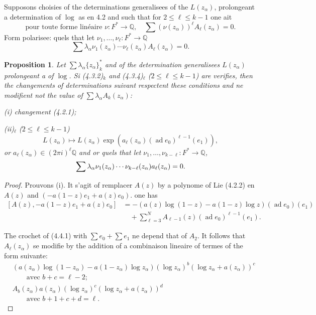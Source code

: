 \documentclass[12pt,a4paper]{article}
\theoremstyle{plain}
\newtheorem{proposition}{Proposition}[section]
\theoremstyle{definition}
\theoremstyle{remark}
\DeclareMathOperator{\ad}{ad}
\newcommand{\Q}{\mathbb{Q}}
\begin{document}
{{Supposons choisies of the determinations generalisees of the $L(z_\alpha)$, prolongeant a determination of $\log$ as en 4.2 and such that for $2\leq\ell\leq k-1$ one ait
\begin{equation}\label{eq:4.3.4}
\text{pour toute forme lin\'eaire }\nu:F^*\to\Q,\quad\sum(\nu(z_\alpha))^\ell A_\ell(z_\alpha)=0.\tag{4.3.4}
\end{equation}
Form polarisee: quels that let $\nu_1,\ldots,\nu_\ell:F^*\to\Q$
\begin{equation}\label{eq:4.3.5}
\sum\lambda_\alpha\nu_1(z_\alpha)\cdots\nu_\ell(z_\alpha)A_\ell(z_\alpha)=0.\tag{4.3.5}
\end{equation}

\begin{proposition}
Let $\sum\lambda_\alpha\{z_\alpha\}_k^*$ and of the determination generalisees $L(z_\alpha)$ prolongeant a of $\log$. Si (4.3.2)$_k$ and (4.3.4)$_\ell$ ($2\leq\ell\leq k-1$) are verifies, then the changements of determinations suivant respectent these conditions and ne modifient not the value of $\sum\lambda_\alpha A_k(z_\alpha)$:

\textup{(i)} changement (4.2.1);

\textup{(ii)}$_\ell$ ($2\leq\ell\leq k-1$)
\begin{equation*}
L(z_\alpha) \longmapsto L(z_\alpha)\exp(a_\ell(z_\alpha)(\ad e_0)^{\ell-1}(e_1)),
\end{equation*}
or $a_\ell(z_\alpha)\in(2\pi i)^\ell\Q$ and or quels that let $\nu_1,\ldots,\nu_{k-\ell}:F^*\to\Q$,
\begin{equation*}
\sum\lambda_\alpha\nu_1(z_\alpha)\cdots\nu_{k-\ell}(z_\alpha)a_\ell(z_\alpha)=0.\qedhere
\end{equation*}
\end{proposition}

\begin{proof}
Prouvons (i). It s'agit of remplacer $A(z)$ by a polynome of Lie (4.2.2) en $A(z)$ and $(-a(1-z)e_1+a(z)e_0)$. one has
\begin{equation}\label{eq:4.4.1}
\begin{aligned}
[A(z),-a(1-z)e_1+a(z)e_0] &= -(a(z)\log(1-z)-a(1-z)\log z)(\ad e_0)(e_1)\\
&\quad +\sum_{\ell=3}^N A_{\ell-1}(z)(\ad e_0)^{\ell-1}(e_1).
\end{aligned}
\tag{4.4.1}
\end{equation}

The crochet of (4.4.1) with $\sum e_0+\sum e_1$ ne depend that of $A_2$. It follows that $A_\ell(z_\alpha)$ se modifie by the addition of a combinaison lineaire of termes of the form suivante:
\begin{align*}
&(a(z_\alpha)\log(1-z_\alpha)-a(1-z_\alpha)\log z_\alpha)(\log z_\alpha)^b(\log z_\alpha+a(z_\alpha))^c\\
&\qquad\text{avec }b+c=\ell-2;\\
&A_b(z_\alpha)a(z_\alpha)(\log z_\alpha)^c(\log z_\alpha+a(z_\alpha))^d\\
&\qquad\text{avec }b+1+c+d=\ell.
\end{align*}


\end{proof}}}
\end{document}
